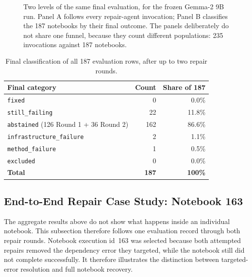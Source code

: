 \begin{figure}[t]
{%
  }
  \caption{Two levels of the same final evaluation, for the frozen Gemma-2
  9B run. Panel A follows every repair-agent invocation; Panel B classifies
  the 187 notebooks by their final outcome. The panels deliberately do not
  share one funnel, because they count different populations: 235
  invocations against 187 notebooks.}
  \label{fig:v-final-funnel}
\end{figure}

\begin{table}[htbp]
  \centering
  \begin{tabular}{|l|r|r|}
    \hline
    \textbf{Final category} & \textbf{Count} & \textbf{Share of 187} \\
    \hline
    \texttt{fixed} & 0 & 0.0\% \\
    \hline
    \texttt{still\_failing} & 22 & 11.8\% \\
    \hline
    \texttt{abstained} (126 Round 1 + 36 Round 2) & 162 & 86.6\% \\
    \hline
    \texttt{infrastructure\_failure} & 2 & 1.1\% \\
    \hline
    \texttt{method\_failure} & 1 & 0.5\% \\
    \hline
    \texttt{excluded} & 0 & 0.0\% \\
    \hline
    \textbf{Total} & \textbf{187} & \textbf{100\%} \\
    \hline
  \end{tabular}
  \caption{Final classification of all 187 evaluation rows, after up to two
  repair rounds.}
  \label{tab:v-final-outcomes}
\end{table}

\FloatBarrier
\subsection{End-to-End Repair Case Study: Notebook 163}
\label{sec:v-case-study}

The aggregate results above do not show what happens inside an individual
notebook. This subsection therefore follows one evaluation record through both
repair rounds. Notebook execution id~163 was selected because both attempted
repairs removed the dependency error they targeted, while the notebook still did
not complete successfully. It therefore illustrates the distinction between
targeted-error resolution and full notebook recovery.

